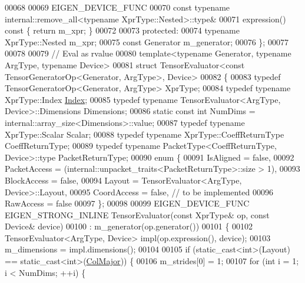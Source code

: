 \begin{DoxyCode}
00068 
00069     EIGEN\_DEVICE\_FUNC
00070     \textcolor{keyword}{const} \textcolor{keyword}{typename} internal::remove\_all<typename XprType::Nested>::type&
00071     expression()\textcolor{keyword}{ const }\{ \textcolor{keywordflow}{return} m\_xpr; \}
00072 
00073   \textcolor{keyword}{protected}:
00074     \textcolor{keyword}{typename} XprType::Nested m\_xpr;
00075     \textcolor{keyword}{const} Generator m\_generator;
00076 \};
00077 
00078 
00079 \textcolor{comment}{// Eval as rvalue}
00080 \textcolor{keyword}{template}<\textcolor{keyword}{typename} Generator, \textcolor{keyword}{typename} ArgType, \textcolor{keyword}{typename} Device>
00081 \textcolor{keyword}{struct }TensorEvaluator<const TensorGeneratorOp<Generator, ArgType>, Device>
00082 \{
00083   \textcolor{keyword}{typedef} TensorGeneratorOp<Generator, ArgType> XprType;
00084   \textcolor{keyword}{typedef} \textcolor{keyword}{typename} XprType::Index \hyperlink{namespace_eigen_a62e77e0933482dafde8fe197d9a2cfde}{Index};
00085   \textcolor{keyword}{typedef} \textcolor{keyword}{typename} TensorEvaluator<ArgType, Device>::Dimensions Dimensions;
00086   \textcolor{keyword}{static} \textcolor{keyword}{const} \textcolor{keywordtype}{int} NumDims = internal::array\_size<Dimensions>::value;
00087   \textcolor{keyword}{typedef} \textcolor{keyword}{typename} XprType::Scalar Scalar;
00088   \textcolor{keyword}{typedef} \textcolor{keyword}{typename} XprType::CoeffReturnType CoeffReturnType;
00089   \textcolor{keyword}{typedef} \textcolor{keyword}{typename} PacketType<CoeffReturnType, Device>::type PacketReturnType;
00090   \textcolor{keyword}{enum} \{
00091     IsAligned = \textcolor{keyword}{false},
00092     PacketAccess = (internal::unpacket\_traits<PacketReturnType>::size > 1),
00093     BlockAccess = \textcolor{keyword}{false},
00094     Layout = TensorEvaluator<ArgType, Device>::Layout,
00095     CoordAccess = \textcolor{keyword}{false},  \textcolor{comment}{// to be implemented}
00096     RawAccess = \textcolor{keyword}{false}
00097   \};
00098 
00099   EIGEN\_DEVICE\_FUNC EIGEN\_STRONG\_INLINE TensorEvaluator(\textcolor{keyword}{const} XprType& op, \textcolor{keyword}{const} Device& device)
00100       : m\_generator(op.generator())
00101   \{
00102     TensorEvaluator<ArgType, Device> impl(op.expression(), device);
00103     m\_dimensions = impl.dimensions();
00104 
00105     \textcolor{keywordflow}{if} (static\_cast<int>(Layout) == static\_cast<int>(\hyperlink{group__enums_ggaacded1a18ae58b0f554751f6cdf9eb13a0cbd4bdd0abcfc0224c5fcb5e4f6669a}{ColMajor})) \{
00106       m\_strides[0] = 1;
00107       \textcolor{keywordflow}{for} (\textcolor{keywordtype}{int} i = 1; i < NumDims; ++i) \{

\end{DoxyCode}

